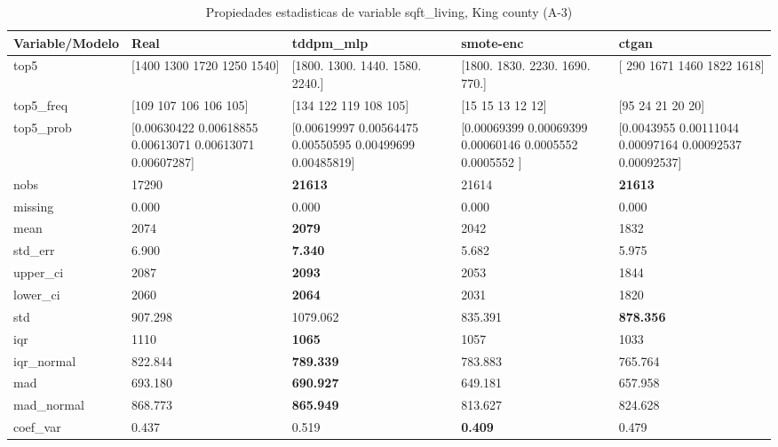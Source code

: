 \begin{table}[H]
\centering
\fontsize{8}{14}\selectfont
\caption{Propiedades  estadisticas de variable sqft\_living, King county (A-3)}
\label{table-stats-king county-a-3-sqft_living}
\begin{tabular}{|l|m{10em}|m{10em}|m{10em}|m{10em}|}
\hline
 \rowcolor[gray]{0.8}
Variable/Modelo & Real & tddpm\_mlp & smote-enc & ctgan \\
\hline top5 & [1400 1300 1720 1250 1540] & [1800. 1300. 1440. 1580. 2240.] & [1800. 1830. 2230. 1690.  770.] & [ 290 1671 1460 1822 1618] \\
\hline top5\_freq & [109 107 106 106 105] & [134 122 119 108 105] & [15 15 13 12 12] & [95 24 21 20 20] \\
\hline top5\_prob & [0.00630422 0.00618855 0.00613071 0.00613071 0.00607287] & [0.00619997 0.00564475 0.00550595 0.00499699 0.00485819] & [0.00069399 0.00069399 0.00060146 0.0005552  0.0005552 ] & [0.0043955  0.00111044 0.00097164 0.00092537 0.00092537] \\
\hline nobs & 17290 & \bfseries 21613 & \cellcolor[rgb]{0.9, 0.54, 0.52} 21614 & \bfseries 21613 \\
\hline missing & 0.000 & 0.000 & 0.000 & 0.000 \\
\hline mean & 2074 & \bfseries 2079 & 2042 & \cellcolor[rgb]{0.9, 0.54, 0.52} 1832 \\
\hline std\_err & 6.900 & \bfseries 7.340 & \cellcolor[rgb]{0.9, 0.54, 0.52} 5.682 & 5.975 \\
\hline upper\_ci & 2087 & \bfseries 2093 & 2053 & \cellcolor[rgb]{0.9, 0.54, 0.52} 1844 \\
\hline lower\_ci & 2060 & \bfseries 2064 & 2031 & \cellcolor[rgb]{0.9, 0.54, 0.52} 1820 \\
\hline std & 907.298 & \cellcolor[rgb]{0.9, 0.54, 0.52} 1079.062 & 835.391 & \bfseries 878.356 \\
\hline iqr & 1110 & \bfseries 1065 & 1057 & \cellcolor[rgb]{0.9, 0.54, 0.52} 1033 \\
\hline iqr\_normal & 822.844 & \bfseries 789.339 & 783.883 & \cellcolor[rgb]{0.9, 0.54, 0.52} 765.764 \\
\hline mad & 693.180 & \bfseries 690.927 & \cellcolor[rgb]{0.9, 0.54, 0.52} 649.181 & 657.958 \\
\hline mad\_normal & 868.773 & \bfseries 865.949 & \cellcolor[rgb]{0.9, 0.54, 0.52} 813.627 & 824.628 \\
\hline coef\_var & 0.437 & \cellcolor[rgb]{0.9, 0.54, 0.52} 0.519 & \bfseries 0.409 & 0.479 \\

\end{tabular}
\end{table}
